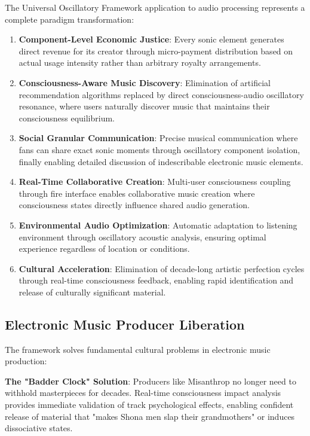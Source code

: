 \documentclass[12pt,a4paper]{article}
\begin{document}
The Universal Oscillatory Framework application to audio processing represents a complete paradigm transformation:

\begin{enumerate}
\item \textbf{Component-Level Economic Justice}: Every sonic element generates direct revenue for its creator through micro-payment distribution based on actual usage intensity rather than arbitrary royalty arrangements.

\item \textbf{Consciousness-Aware Music Discovery}: Elimination of artificial recommendation algorithms replaced by direct consciousness-audio oscillatory resonance, where users naturally discover music that maintains their consciousness equilibrium.

\item \textbf{Social Granular Communication}: Precise musical communication where fans can share exact sonic moments through oscillatory component isolation, finally enabling detailed discussion of indescribable electronic music elements.

\item \textbf{Real-Time Collaborative Creation}: Multi-user consciousness coupling through fire interface enables collaborative music creation where consciousness states directly influence shared audio generation.

\item \textbf{Environmental Audio Optimization}: Automatic adaptation to listening environment through oscillatory acoustic analysis, ensuring optimal experience regardless of location or conditions.

\item \textbf{Cultural Acceleration}: Elimination of decade-long artistic perfection cycles through real-time consciousness feedback, enabling rapid identification and release of culturally significant material.
\end{enumerate}

\subsection{Electronic Music Producer Liberation}

The framework solves fundamental cultural problems in electronic music production:

\textbf{The "Badder Clock" Solution}: Producers like Misanthrop no longer need to withhold masterpieces for decades. Real-time consciousness impact analysis provides immediate validation of track psychological effects, enabling confident release of material that "makes Shona men slap their grandmothers" or induces dissociative states.
\end{document}
